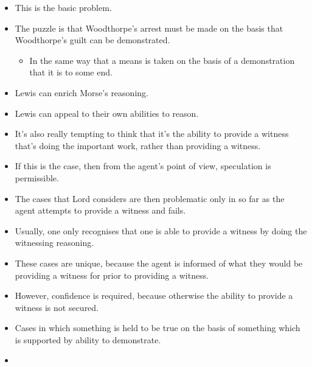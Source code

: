 \documentclass[10pt]{article}
\begin{document}
\begin{itemize}
\item This is the basic problem.
\item The puzzle is that Woodthorpe's arrest must be made on the basis that Woodthorpe's guilt can be demonstrated.
  \begin{itemize}
  \item In the same way that a means is taken on the basis of a demonstration that it is to some end.
  \end{itemize}
\end{itemize}

\begin{itemize}
\item Lewis can enrich Morse's reasoning.
\item Lewis can appeal to their own abilities to reason.
\end{itemize}

\begin{itemize}
\item It's also really tempting to think that it's the ability to provide a witness that's doing the important work, rather than providing a witness.
\item If this is the case, then from the agent's point of view, speculation is permissible.
\item The cases that Lord considers are then problematic only in so far as the agent attempts to provide a witness and fails.
\item Usually, one only recognises that one is able to provide a witness by doing the witnessing reasoning.
\item These cases are unique, because the agent is informed of what they would be providing a witness for prior to providing a witness.
\item However, confidence is required, because otherwise the ability to provide a witness is not secured.
\end{itemize}

\begin{itemize}
\item Cases in which something is held to be true on the basis of something which is supported by ability to demonstrate.
\item 
\end{itemize}

\newpage
\end{document}
